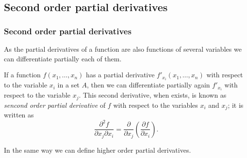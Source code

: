 % 
% 
% 
% 
% 
\subsection{Second order partial derivatives}
\begin{frame}
\frametitle{Second order partial derivatives}
As the partial derivatives of a function are also functions of several variables we can differentiate partially each of them. 

If a function $f(x_1,\ldots,x_n)$ has a partial derivative $f'_{x_i}(x_1,\ldots,x_n)$ with respect to the variable $x_i$ in a set $A$, then we can differentiate partially again $f'_{x_i}$ with respect to the variable $x_j$. 
This second derivative, when exists, is known as \emph{sencond order partial derivative} of $f$ with respect to the variables $x_i$ and $x_j$; it is written as 
\[
\frac{\partial ^2 f}{\partial x_j \partial x_i}= \frac{\partial}{\partial x_j}\left(\frac{\partial f}{\partial x_i}\right).
\]

In the same way we can define higher order partial derivatives.
\end{frame}


